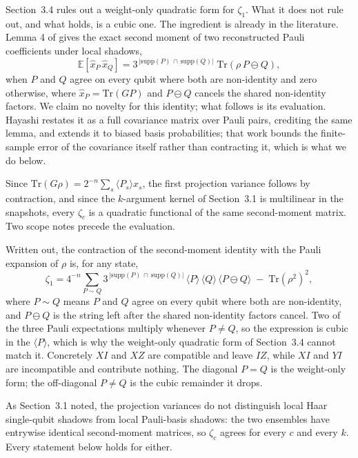 \documentclass[a4paper,superscriptaddress,nofootinbib,onecolumn,nopdfoutputerror]{quantumarticle}
\begin{document}
Section~3.4 rules out a weight-only quadratic form for \(\zeta_1\). What
it does not rule out, and what holds, is a cubic one. The ingredient is
already in the literature. Lemma 4 of \cite{huang2020shadows} gives the
exact second moment of two reconstructed Pauli coefficients under local
shadows,
\[
\mathbb{E}\!\left[\hat x_{P}\, \hat x_{Q}\right]
= 3^{\,|\mathrm{supp}(P)\, \cap\, \mathrm{supp}(Q)|}\;
\mathrm{Tr}\!\left(\rho\, P\!\ominus\!Q\right),
\]
when \(P\) and \(Q\) agree on every qubit where both are non-identity and
zero otherwise, where \(\hat x_P = \mathrm{Tr}(G P)\) and \(P \ominus Q\)
cancels the shared non-identity factors. We claim no novelty for this
identity; what follows is its evaluation. Hayashi
\cite{hayashi2026covariance} restates it as a full covariance matrix over
Pauli pairs, crediting the same lemma, and extends it to biased basis
probabilities; that work bounds the finite-sample error of the covariance
itself rather than contracting it, which is what we do below.

Since \(\mathrm{Tr}(G\rho) = 2^{-n}\sum_s \langle P_s\rangle \hat x_s\),
the first projection variance follows by contraction, and since the
\(k\)-argument kernel of Section~3.1 is multilinear in the snapshots,
every \(\zeta_c\) is a quadratic functional of the same second-moment matrix. Two scope notes
precede the evaluation.

Written out, the contraction of the second-moment identity with the
Pauli expansion of \(\rho\) is, for any state,
\[
\zeta_1
= 4^{-n}\!\!\sum_{P \sim Q}
3^{\,|\mathrm{supp}(P)\,\cap\,\mathrm{supp}(Q)|}\,
\langle P\rangle\,\langle Q\rangle\,\langle P\ominus Q\rangle
\;-\; \mathrm{Tr}(\rho^2)^2 ,
\]
where \(P \sim Q\) means \(P\) and \(Q\) agree on every qubit where both
are non-identity, and \(P \ominus Q\) is the string left after the shared
non-identity factors cancel. Two of the three Pauli expectations multiply
whenever \(P \neq Q\), so the expression is cubic in the \(\langle P\rangle\),
which is why the weight-only quadratic form of Section~3.4 cannot match
it. Concretely \(XI\) and \(XZ\) are compatible and leave \(IZ\), while
\(XI\) and \(YI\) are incompatible and contribute nothing. The diagonal
\(P = Q\) is the weight-only form; the off-diagonal \(P \neq Q\) is the
cubic remainder it drops.

As Section~3.1 noted, the projection variances do
not distinguish local Haar single-qubit shadows from local Pauli-basis
shadows: the two ensembles have entrywise identical second-moment
matrices, so \(\zeta_c\) agrees for every \(c\) and every \(k\). Every
statement below holds for either.
\end{document}

